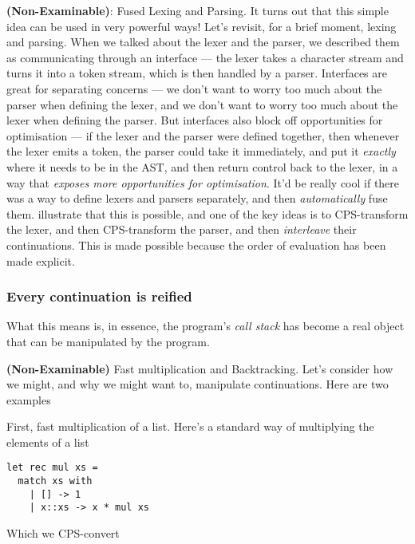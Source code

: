 {\sffamily \textbf{(Non-Examinable)}: Fused Lexing and Parsing.} It turns out that this simple idea can be used in very powerful ways! Let's revisit, for a brief moment, lexing and parsing. When we talked about the lexer and the parser, we described them as communicating through an interface --- the lexer takes a character stream and turns it into a token stream, which is then handled by a parser. Interfaces are great for separating concerns --- we don't want to worry too much about the parser when defining the lexer, and we don't want to worry too much about the lexer when defining the parser. But interfaces also block off opportunities for optimisation --- if the lexer and the parser were defined together, then whenever the lexer emits a token, the parser could take it immediately, and put it \emph{exactly} where it needs to be in the AST, and then return control back to the lexer, in a way that \textit{exposes more opportunities for optimisation}. It'd be really cool if there was a way to define lexers and parsers separately, and then \emph{automatically} fuse them. \citet{yallop-2023} illustrate that this is possible, and one of the key ideas is to CPS-transform the lexer, and then CPS-transform the parser, and then \emph{interleave} their continuations. This is made possible because the order of evaluation has been made explicit. 

\subsubsection{Every continuation is reified}
What this means is, in essence, the program's \emph{call stack} has become a real object that can be manipulated by the program. 

{\sffamily \textbf{(Non-Examinable)} Fast multiplication and Backtracking}. Let's consider how we might, and why we might want to, manipulate continuations. Here are two examples

First, fast multiplication of a list. Here's a standard way of multiplying the elements of a list 

\begin{code}
\label{code:mul-ocaml}
\begin{verbatim}
let rec mul xs = 
  match xs with
    | [] -> 1
    | x::xs -> x * mul xs
\end{verbatim}
\end{code}

Which we CPS-convert

